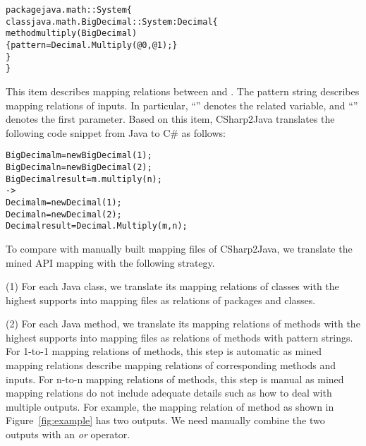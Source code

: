 \begin{CodeOut}\vspace*{-1ex}
\begin{alltt}
package java.math :: System \{
  class java.math.BigDecimal :: System:Decimal \{
    method multiply(BigDecimal)
       \{ pattern =  Decimal.Multiply(@0, @1); \}
  \}
\}
\end{alltt}
\end{CodeOut}\vspace*{-1ex}

This item describes mapping relations between  and . The
pattern string describes mapping relations of inputs. In particular,
``'' denotes the related variable, and ``''
denotes the first parameter. Based on this item, CSharp2Java
translates the following code snippet from Java to C\# as follows:

\begin{CodeOut}\vspace*{-1ex}
\begin{alltt}
  BigDecimal m = new BigDecimal(1);
  BigDecimal n = new BigDecimal(2);
  BigDecimal result = m.multiply(n);
  ->
  Decimal m = new Decimal(1);
  Decimal n = new Decimal(2);
  Decimal result = Decimal.Multiply(m,n);
\end{alltt}
\end{CodeOut}\vspace*{-1ex}

To compare with manually built mapping files of CSharp2Java, we
translate the mined API mapping with the following strategy.

(1) For each Java class, we translate its mapping relations of
classes with the highest supports into mapping files as relations of
packages and classes.

(2) For each Java method, we translate its mapping relations of
methods with the highest supports into mapping files as relations of
methods with pattern strings. For 1-to-1 mapping relations of
methods, this step is automatic as mined mapping relations describe
mapping relations of corresponding methods and inputs. For n-to-n
mapping relations of methods, this step is manual as mined mapping
relations do not include adequate details such as how to deal with
multiple outputs. For example, the mapping relation of method as
shown in Figure~\ref{fig:example} has two outputs. We need manually
combine the two outputs with an \emph{or} operator.

